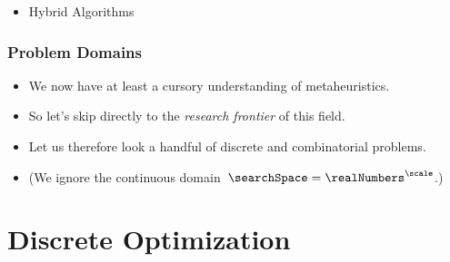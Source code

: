 \documentclass[aspectratio=169,mathserif,notheorems]{beamer}%
\begin{document}
\begin{frame}[t]
\begin{itemize}
{\begin{itemize}
{}%
\end{itemize}%
}%
%
\item<14-> Hybrid Algorithms%
%
\end{itemize}%
%
\end{frame}%
%
%
\gdef\sharedSlideTitle{Example:~RLS and the $(1+1)$~EA}%
%
%
\xdef\sharedSlideTitle{Example:~Simulated Annealing}%
%
%
\begin{frame}%
\frametitle{Problem Domains}%
\begin{itemize}%
\item We now have at least a cursory understanding of \glspl{metaheuristic}.%
\item<2-> So let's skip directly to the \emph{research frontier} of this field.%
\item<3-> Let us therefore look a handful of discrete and combinatorial problems.%
\item<4-> (We ignore the continuous domain~$\searchSpace=\realNumbers^{\scale}$.)%
\end{itemize}%
\end{frame}%
%
%
\section{Discrete Optimization}%
\end{document}
